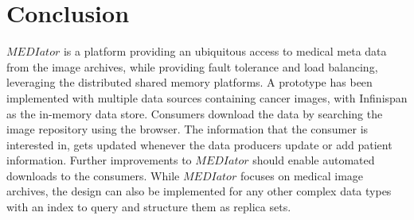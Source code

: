 \documentclass[letterpaper, 10 pt, conference]{ieeeconf}  %
\begin{document}


\section{Conclusion}
\balance

$MEDIator$ is a platform providing an ubiquitous access to medical meta data from the image archives, while providing fault tolerance and load balancing, leveraging the distributed shared memory platforms. A prototype has been implemented with multiple data sources containing cancer images, with Infinispan as the in-memory data store. Consumers download the data by searching the image repository using the browser. The information that the consumer is interested in, gets updated whenever the data producers update or add patient information. Further improvements to $MEDIator$ should enable automated downloads to the consumers. While $MEDIator$ focuses on medical image archives, the design can also be implemented for any other complex data types with an index to query and structure them as replica sets.


\end{document}
